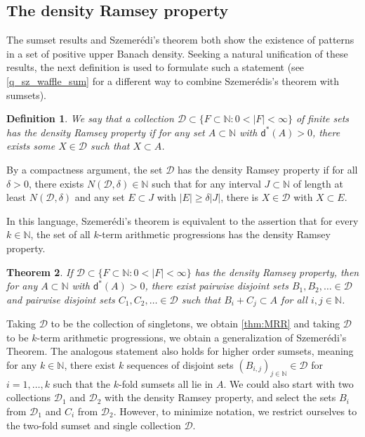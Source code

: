 \documentclass[10pt,dvipsnames]{article}
\newtheorem{theorem}{Theorem}[section]
\newtheorem{definition}[theorem]{Definition}
\theoremstyle{definition}
\theoremstyle{plain}
\newcommand{\define}[1]{\textit{#1}}
\newcommand{\N}{\mathbb{N}}
\newcommand{\CD}{\mathcal{D}}
\newcommand{\ubdens}{\mathsf{d}^*}
\newcommand{\Szemeredi}{Szemer\'{e}di}
\begin{document}
\subsection{The density Ramsey property}
\label{sec:szemeredi-and-sumset}
The sumset results and \Szemeredi{}'s theorem both show the existence of patterns in a set of positive upper Banach density.  Seeking a natural unification of these results, the next definition is used to formulate such a statement (see \cref{q_sz_waffle_sum} for a different way to combine Szemer\'edis's theorem with sumsets).

\begin{definition}
We say that a collection $\CD \subset\{F\subset\N\colon 0 < |F|< \infty\}$ of finite sets has the \define{density Ramsey property} if for any set $A\subset \N$ with $\ubdens(A)> 0$, there exists some $X\in\CD$ such that $X\subset A$.
\end{definition}

By a compactness argument, the set $\CD$ 
has the density Ramsey property  if for all $\delta > 0$, there exists 
$N(\CD, \delta)\in\N$ such that for any interval $J\subset\N$ of length at least $N(\CD, \delta)$ and any set $E\subset J$ with $|E|\geq \delta |J|$, there is $X\in\CD$ with $X\subset E$.

In this language, \Szemeredi{}'s theorem is equivalent to the assertion that for every $k \in \N$, the set of all $k$-term arithmetic progressions has the density Ramsey property.

\begin{theorem}
\label{thm_sumset_szemeredi}
If $\CD\subset\{F\subset\N\colon 0 < |F|< \infty\}$ has the density Ramsey property, then for any $A\subset \N$ with $\ubdens(A)> 0$, there exist pairwise disjoint sets 
$B_1, B_2, \ldots\in\CD$ and pairwise disjoint sets $C_1, C_2, \ldots\in\CD$ such that $B_i+C_j\subset A$ for all $i,j\in\N$.  
\end{theorem}

Taking $\CD$ to be the collection of singletons, we obtain \cref{thm:MRR} and taking $\CD$ to be $k$-term arithmetic progressions, we obtain a generalization of \Szemeredi{}'s Theorem. 
The analogous statement also holds for higher order sumsets, meaning for any $k\in\N$, there exist $k$ sequences of disjoint sets $(B_{i,j})_{j\in\N}\in\CD$ for $i=1, \dots, k$ such that the $k$-fold sumsets all lie in $A$. We could also start with two collections $\CD_1$ and $\CD_2$ with the density Ramsey property, and select the sets $B_i$ from $\CD_1$ and $C_i$ from $\CD_2$.  However, to minimize notation, we restrict ourselves to the two-fold sumset and single collection $\CD$.
\end{document}
